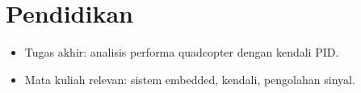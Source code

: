 \section{Pendidikan}
\begin{itemize}
  \item Tugas akhir: analisis performa quadcopter dengan kendali PID.
  \item Mata kuliah relevan: sistem embedded, kendali, pengolahan sinyal.
\end{itemize}
